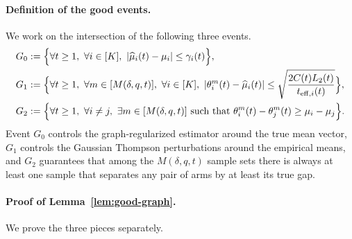\documentclass{article}
\begin{document}
\paragraph{Definition of the good events.}
We work on the intersection of the following three events.
\begin{align*}
G_0
&:=
\Bigl\{
\forall t\ge 1,\ \forall i\in[K],\
|\widehat\mu_i(t)-\mu_i|\le \gamma_i(t)
\Bigr\},\\
G_1
&:=
\Bigl\{
\forall t\ge 1,\ \forall m\in[M(\delta,q,t)],\ \forall i\in[K],\
|\theta_i^m(t)-\widehat\mu_i(t)|
\le
\sqrt{\frac{2C(t)L_2(t)}{t_{\mathrm{eff},i}(t)}}
\Bigr\},\\
G_2
&:=
\Bigl\{
\forall t\ge 1,\ \forall i\neq j,\ \exists m\in[M(\delta,q,t)]
\text{ such that }
\theta_i^m(t)-\theta_j^m(t)\ge \mu_i-\mu_j
\Bigr\}.
\end{align*}
Event $G_0$ controls the graph-regularized estimator around the true mean vector, $G_1$ controls the Gaussian Thompson perturbations around the empirical means, and $G_2$ guarantees that among the $M(\delta,q,t)$ sample sets there is always at least one sample that separates any pair of arms by at least its true gap.

\paragraph{Proof of Lemma~\ref{lem:good-graph}.}
We prove the three pieces separately.
\end{document}
